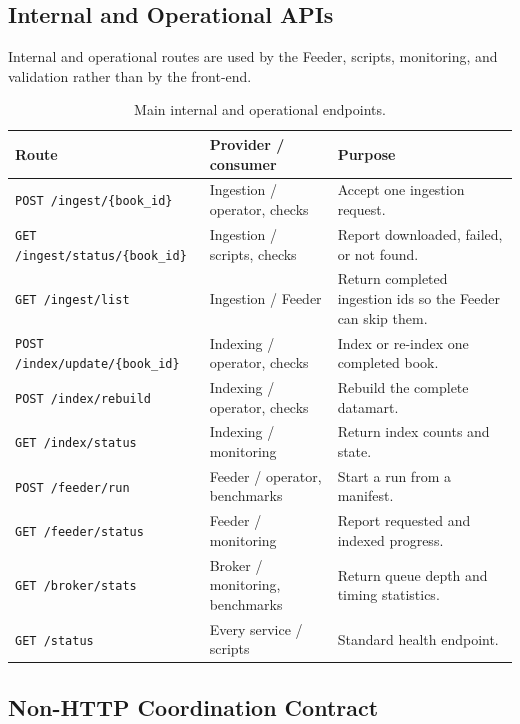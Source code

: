 \documentclass[12pt,a4paper]{article}
\begin{document}
\subsection{Internal and Operational APIs}

Internal and operational routes are used by the Feeder, scripts, monitoring, and validation rather
than by the front-end.

\begin{table}[H]
    \centering
    \caption{Main internal and operational endpoints.}
    \scriptsize
    \begin{tabularx}{\textwidth}{p{} p{} X}
        \toprule
        \textbf{Route} & \textbf{Provider / consumer} & \textbf{Purpose} \\
        \midrule
        \texttt{POST /ingest/\{book\_id\}} & Ingestion / operator, checks & Accept one ingestion request. \\
        \texttt{GET /ingest/status/\{book\_id\}} & Ingestion / scripts, checks & Report downloaded, failed, or not found. \\
        \texttt{GET /ingest/list} & Ingestion / Feeder & Return completed ingestion ids so the Feeder can skip them. \\
        \texttt{POST /index/update/\{book\_id\}} & Indexing / operator, checks & Index or re-index one completed book. \\
        \texttt{POST /index/rebuild} & Indexing / operator, checks & Rebuild the complete datamart. \\
        \texttt{GET /index/status} & Indexing / monitoring & Return index counts and state. \\
        \texttt{POST /feeder/run} & Feeder / operator, benchmarks & Start a run from a manifest. \\
        \texttt{GET /feeder/status} & Feeder / monitoring & Report requested and indexed progress. \\
        \texttt{GET /broker/stats} & Broker / monitoring, benchmarks & Return queue depth and timing statistics. \\
        \texttt{GET /status} & Every service / scripts & Standard health endpoint. \\
        \bottomrule
    \end{tabularx}
\end{table}

\subsection{Non-HTTP Coordination Contract}
\end{document}
